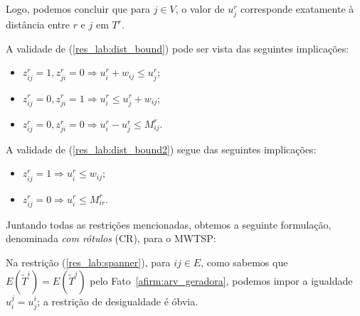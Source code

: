Logo, podemos concluir que
para $j \in V$, o valor de $u^r_j$ corresponde exatamente à distância entre
$r$ e $j$ em $T^{r}$.

A validade de (\ref{res_lab:dist_bound}) pode ser vista das seguintes implicações:

\begin{itemize}
\item $z^r_{ij} = 1, z^r_{ji} = 0 \Rightarrow u^r_i + w_{ij} \le u^r_j$;
\item $z^r_{ij} = 0, z^r_{ji} = 1 \Rightarrow u^r_i \le u^r_j + w_{ij}$;
\item $z^r_{ij} = 0, z^r_{ji} = 0 \Rightarrow u^r_i - u^r_j \le M^{r}_{ij}$. 
\end{itemize}

A validade de (\ref{res_lab:dist_bound2}) segue das seguintes implicações:

\begin{itemize}
\item $z^r_{ij} = 1 \Rightarrow u^r_i \le w_{ij}$;
\item $z^r_{ij} = 0 \Rightarrow u^r_i \le M^{r}_{ir}$.
  \end{itemize}

Juntando todas as restrições mencionadas, obtemos a seguinte formulação,
denominada \emph{com rótulos} (CR), para o MWTSP:

\pagebreak

  \begin{lpformulation} %
\end{lpformulation}
  Na restrição (\ref{res_lab:spanner}), para $ij \in E$, como sabemos que
  $E(\widetilde{T}^{i}) = E(\widetilde{T}^{j})$ pelo
  Fato~\ref{afirm:arv_geradora}, podemos impor a igualdade
  $u^{j}_{i} = u^{i}_{j}$;  a restrição de desigualdade é óbvia. 

